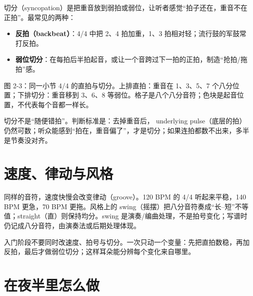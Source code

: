 切分（syncopation）是把重音放到弱拍或弱位，让听者感觉“拍子还在，重音不在正拍”。最常见的两种：

\begin{itemize}
  \item \textbf{反拍（backbeat）}：4/4 中把 2、4 拍加重，1、3 拍相对轻；流行鼓的军鼓常打反拍。
  \item \textbf{弱位切分}：在每拍后半拍起音，或让一个音跨过下一拍的正拍，制造“抢拍/拖拍”感。
\end{itemize}

\begin{center}

\small 图 2-3：同一小节 4/4 的直拍与切分。上排直拍：重音在 1、3、5、7 个八分位置；下排切分：重音移到 3、6、8 等弱位。格子是八个八分音符；色块是起音位置，不代表每个音都一样长。
\end{center}

切分不是“随便错拍”。判断标准是：去掉重音后， underlying pulse（底层的拍）仍然可数；听众能感到“拍在，重音偏了”，才是切分；如果连拍都数不出来，多半是节奏没对齐。

\section{速度、律动与风格}

同样的音符，速度快慢会改变律动（groove）。120 BPM 的 4/4 听起来平稳，140 BPM 更急，70 BPM 更拖。风格上的 swing（摇摆）把八分音符奏成“长–短”不等值；straight（直）则保持均分。swing 是演奏/编曲处理，不是拍号变化；写谱时仍记成八分音符，由演奏法或后期处理体现。

入门阶段不要同时改速度、拍号与切分。一次只动一个变量：先把直拍数稳，再加反拍，最后才做弱位切分；这样耳朵能分辨每个变化来自哪里。

\section{在夜半里怎么做}

